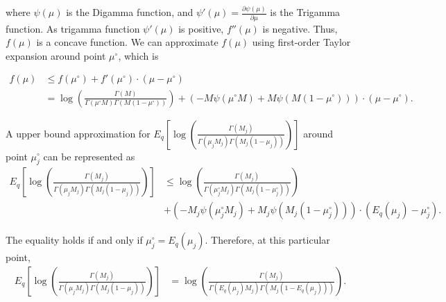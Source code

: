 \documentclass[11pt,reqno]{amsart}
\begin{document}
where $ \psi(\mu) $ is the Digamma function, and $ \psi'(\mu)= \frac{\partial \psi(\mu)}{\partial \mu}$ is the Trigamma function. As trigamma function $ \psi'(\mu) $ is positive, $ f''(\mu) $ is negative. Thus, $ f(\mu) $ is a concave function. We can approximate $ f(\mu) $ using first-order Taylor expansion around point $ \mu^{\circ} $, which is

\begin{equation}
\begin{split}
f(\mu) &\leq f(\mu^{\circ}) + f'(\mu^{\circ}) \cdot (\mu-\mu^{\circ}) \nonumber \\
&= \log\left( \frac{\Gamma(M)}{\Gamma(\mu^{\circ} M) \Gamma(M (1-\mu^{\circ} ))}\right) + \left( -M \psi (\mu^{\circ} M) + M \psi(M (1-\mu^{\circ} ))\right) \cdot (\mu-\mu^{\circ}).
\end{split}
\end{equation}

A upper bound approximation for $ E_q  \left[ \log \left( \frac{ \Gamma(M_j) } { \Gamma(\mu_j M_j) \Gamma(M_j (1-\mu_j)) }\right) \right] $ around point $ \mu_j^{\circ} $ can be represented as
\begin{equation}
\begin{split}
E_q  \left[ \log \left( \frac{ \Gamma(M_j) } { \Gamma(\mu_j M_j) \Gamma(M_j (1-\mu_j)) }\right) \right] &\leq \log\left( \frac{\Gamma(M_j)}{\Gamma(\mu_j^{\circ} M_j) \Gamma(M_j (1-\mu_j^{\circ} ))}\right) \\
\quad &+ \left( -M_j \psi (\mu_j^{\circ} M_j) + M_j \psi(M_j (1-\mu_j^{\circ} ))\right) \cdot (E_q(\mu_j)-\mu_j^{\circ}).\nonumber
\end{split}
\end{equation}

The equality holds if and only if $ \mu_j^{\circ} =E_q(\mu_j) $. Therefore, at this particular point,
\begin{equation}
\begin{split}
E_q  \left[ \log \left( \frac{ \Gamma(M_j) } { \Gamma(\mu_j M_j) \Gamma(M_j (1-\mu_j)) }\right) \right] &= \log\left( \frac{\Gamma(M_j)}{\Gamma(E_q(\mu_j) M_j) \Gamma(M_j (1-E_q(\mu_j) ))}\right).\nonumber
\end{split}
\end{equation}
\end{document}
